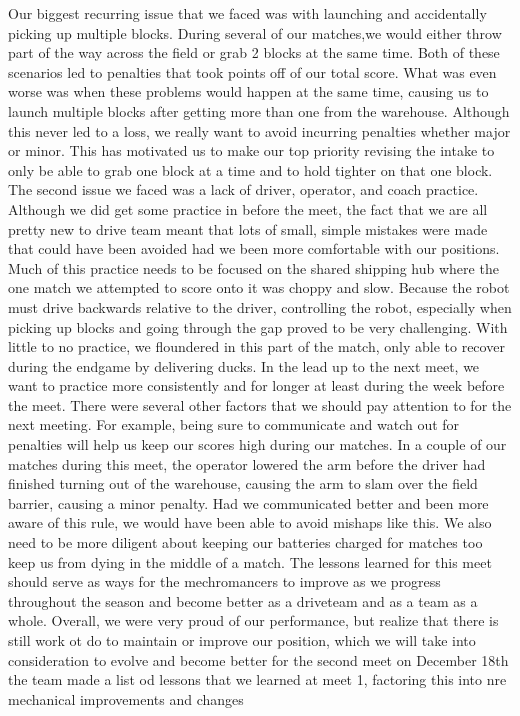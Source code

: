 Our biggest recurring issue that we faced was with launching and accidentally picking up multiple blocks. During several of our matches,we would either throw part of the way across the field or grab 2 blocks at the same time. Both of these scenarios led to penalties that took points off of our total score. What was even worse was when these problems would happen at the same time, causing us to launch multiple blocks after getting more than one from the warehouse. Although this never led to a loss, we really want to avoid incurring penalties whether major or minor. This has motivated us to make our top priority revising the intake to only be able to grab one block at a time and to hold tighter on that one block.
The second issue we faced was a lack of driver, operator, and coach practice. Although we did get some practice in before  the meet, the fact that we are all pretty new to drive team meant that lots of small, simple mistakes were made that could have been avoided had we been more comfortable with our positions. Much of this practice needs to be focused on the shared shipping hub where the one match we attempted to score onto it was choppy and slow. Because the robot must drive backwards relative to the driver, controlling the robot, especially when picking up blocks and going through the gap proved to be very challenging. With little to no practice, we floundered in this part of the match, only able to recover during the endgame by delivering ducks. In the lead up to the next meet, we want to practice more consistently and for longer at least during the week before the meet. 
There were several other factors that we should pay attention to for the next meeting. For example, being sure to communicate and watch out for penalties will help us keep our scores high during our matches. In a couple of our matches during this meet, the operator lowered the arm before the driver had finished turning out of the warehouse, causing the arm to slam over the field barrier, causing a minor penalty. Had we communicated better and been more aware of this rule, we would have been able to avoid mishaps like this. We also need to be more diligent about keeping our batteries charged for matches too keep us from dying in the middle of a match.
The lessons learned for this meet should serve as ways for the mechromancers to improve as we progress throughout the season and become better as a driveteam and as a team as a whole.
Overall, we were very proud of our performance, but realize that there is still work ot do to maintain or improve our position, which we will take into consideration to evolve and become better for the second meet on December 18th the team made a list od lessons that we learned at meet 1, factoring this into nre mechanical improvements and changes

